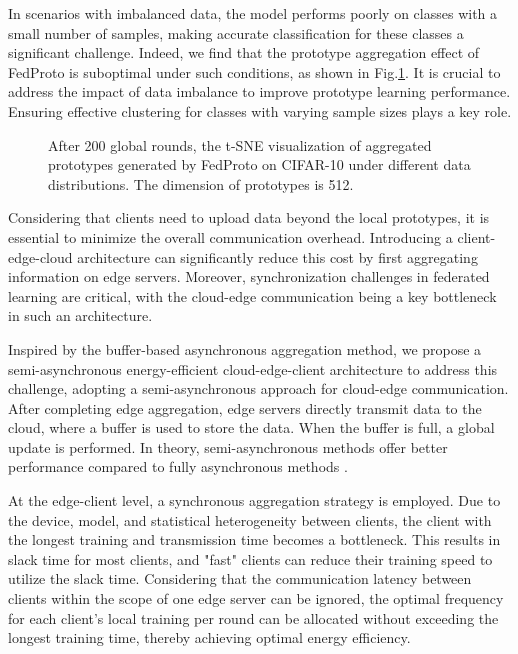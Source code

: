 \documentclass[journal]{IEEEtran}
\begin{document}
In scenarios with imbalanced data, the model performs poorly on classes with a small number of samples, making accurate classification for these classes a significant challenge. Indeed, we find that the prototype aggregation effect of FedProto\cite{tan_fedproto_2021} is suboptimal under such conditions, as shown in Fig.\ref{motivation_tsne}. It is crucial to address the impact of data imbalance to improve prototype learning performance. Ensuring effective clustering for classes with varying sample sizes plays a key role.

\begin{figure}[H]
    \centering
    \hfill

    \caption{After 200 global rounds, the t-SNE visualization of aggregated prototypes generated by FedProto on CIFAR-10 under different data distributions. The dimension of prototypes is 512.}
    \label{motivation_tsne}
\end{figure}
Considering that clients need to upload data beyond the local prototypes, it is essential to minimize the overall communication overhead. Introducing a client-edge-cloud architecture \cite{liu_client-edge-cloud_2020,liu_hierarchical_2023} can significantly reduce this cost by first aggregating information on edge servers. Moreover, synchronization challenges in federated learning are critical, with the cloud-edge communication being a key bottleneck in such an architecture. 

Inspired by the buffer-based asynchronous aggregation method\cite{nguyen_federated_2022}, we propose a semi-asynchronous energy-efficient cloud-edge-client architecture to address this challenge, adopting a semi-asynchronous approach for cloud-edge communication. After completing edge aggregation, edge servers directly transmit data to the cloud, where a buffer is used to store the data. When the buffer is full, a global update is performed. In theory, semi-asynchronous methods offer better performance compared to fully asynchronous methods \cite{nguyen_federated_2022}.

At the edge-client level, a synchronous aggregation strategy is employed. Due to the device, model, and statistical heterogeneity between clients, the client with the longest training and transmission time becomes a bottleneck. This results in slack time for most clients, and "fast" clients can reduce their training speed to utilize the slack time. Considering that the communication latency between clients within the scope of one edge server can be ignored, the optimal frequency for each client's local training per round can be allocated without exceeding the longest training time, thereby achieving optimal energy efficiency. 
\end{document}
